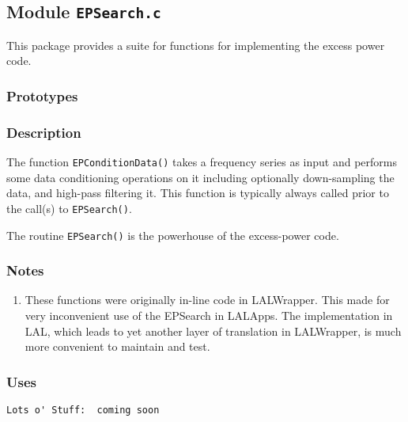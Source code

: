 \newpage
\subsection{Module \texttt{EPSearch.c}}
\label{ss:EPSearch.c}

This package provides a suite for functions for implementing the
excess power code. 

\subsubsection*{Prototypes}
\vspace{0.1in}



\subsubsection*{Description}

The function \texttt{EPConditionData()} takes a frequency series as input
and performs some data conditioning operations on it including optionally
down-sampling the data, and high-pass filtering it.  This function is
typically always called prior to the call(s) to \texttt{EPSearch()}.

The routine \texttt{EPSearch()} is the powerhouse of the excess-power code.


\subsubsection*{Notes}

\begin{enumerate}
\item These functions were originally in-line code in LALWrapper.  This
made for very inconvenient use of the EPSearch in LALApps.  The
implementation in LAL,  which leads to yet another layer of translation in
LALWrapper,  is much more convenient to maintain and test.
\end{enumerate}

\subsubsection*{Uses}
\begin{verbatim}
Lots o' Stuff:  coming soon
\end{verbatim}
